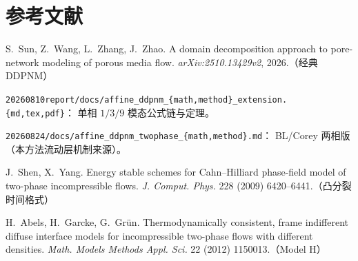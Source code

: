 \documentclass[11pt]{article}
\theoremstyle{definition}
\theoremstyle{plain}
\theoremstyle{remark}
\begin{document}
\section*{参考文献}
\begin{enumerate}[label={[\arabic*]}, leftmargin=2em]
\item S.~Sun, Z.~Wang, L.~Zhang, J.~Zhao. A domain decomposition approach to
pore-network modeling of porous media flow. \emph{arXiv:2510.13429v2}, 2026.（经典 DDPNM）
\item \texttt{20260810report/docs/affine\_ddpnm\_\{math,method\}\_extension.\{md,tex,pdf\}}：
单相 $1/3/9$ 模态公式链与定理。
\item \texttt{20260824/docs/affine\_ddpnm\_twophase\_\{math,method\}.md}：
BL/Corey 两相版（本方法流动层机制来源）。
\item J.~Shen, X.~Yang. Energy stable schemes for Cahn--Hilliard phase-field model
of two-phase incompressible flows. \emph{J. Comput. Phys.} 228 (2009) 6420--6441.（凸分裂时间格式）
\item H.~Abels, H.~Garcke, G.~Gr\"un. Thermodynamically consistent, frame
indifferent diffuse interface models for incompressible two-phase flows with
different densities. \emph{Math. Models Methods Appl. Sci.} 22 (2012) 1150013.（Model H）
\end{enumerate}
\end{document}
